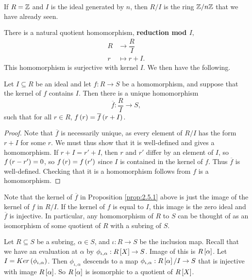 \begin{example2}
If $ R = \Z $ and $ I $ is the ideal generated by $ n $, then $ R / I $ is the ring $ \Z / n\Z $ that we have already seen.
\end{example2}

There is a natural quotient homomorphism, \textbf{reduction mod $ I $},
\begin{align*}
R & \to \dfrac{R}{I} \\
r & \mapsto r + I.
\end{align*}
This homomorphism is surjective with kernel $ I $. We then have the following.

\begin{proposition}
\label{prop:2.5.1}
Let $ I \subseteq R $ be an ideal and let $ f : R \to S $ be a homomorphism, and suppose that the kernel of $ f $ contains $ I $. Then there is a unique homomorphism
$$ \overline{f} : \dfrac{R}{I} \to S, $$
such that for all $ r \in R $, $ f\rb{r} = \overline{f}\rb{r + I} $.
\end{proposition}

\begin{proof}
Note that $ \overline{f} $ is necessarily unique, as every element of $ R / I $ has the form $ r + I $ for some $ r $. We must thus show that it is well-defined and gives a homomorphism. If $ r + I = r' + I $, then $ r $ and $ r' $ differ by an element of $ I $, so $ f\rb{r - r'} = 0 $, so $ f\rb{r} = f\rb{r'} $ since $ I $ is contained in the kernel of $ f $. Thus $ \overline{f} $ is well-defined. Checking that it is a homomorphism follows from $ f $ is a homomorphism.
\end{proof}

Note that the kernel of $ \overline{f} $ in Proposition \ref{prop:2.5.1} above is just the image of the kernel of $ f $ in $ R / I $. If the kernel of $ f $ is equal to $ I $, this image is the zero ideal and $ \overline{f} $ is injective. In particular, any homomorphism of $ R $ to $ S $ can be thought of as an isomorphism of some quotient of $ R $ with a subring of $ S $.

\begin{example2}
Let $ R \subseteq S $ be a subring, $ \alpha \in S $, and $ \iota : R \to S $ be the inclusion map. Recall that we have an evaluation at $ \alpha $ by $ \phi_{\iota, \alpha} : R\sb{X} \to S $. Image of this is $ R\sb{\alpha} $. Let $ I = Ker\rb{\phi_{\iota, \alpha}} $. Then $ \phi_{\iota, \alpha} $ descends to a map $ \phi_{\iota, \alpha} : R\sb{\alpha} / I \to S $ that is injective with image $ R\sb{\alpha} $. So $ R\sb{\alpha} $ is isomorphic to a quotient of $ R\sb{X} $.
\end{example2}

